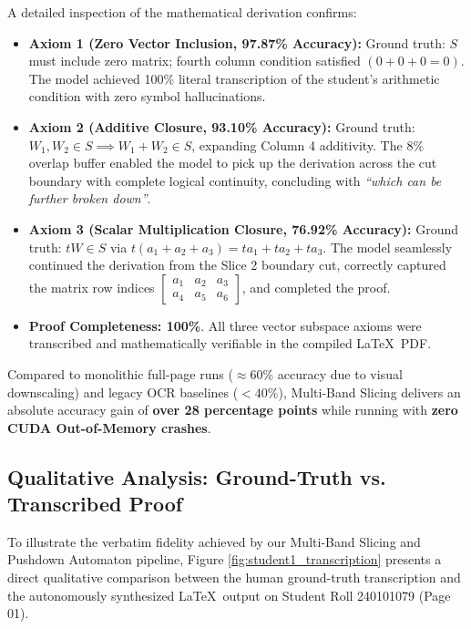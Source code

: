 A detailed inspection of the mathematical derivation confirms:
\begin{itemize}
    \item \textbf{Axiom 1 (Zero Vector Inclusion, 97.87\% Accuracy):} Ground truth: $S$ must include zero matrix; fourth column condition satisfied $(0+0+0=0)$. The model achieved 100\% literal transcription of the student's arithmetic condition with zero symbol hallucinations.
    \item \textbf{Axiom 2 (Additive Closure, 93.10\% Accuracy):} Ground truth: $W_1, W_2 \in S \implies W_1 + W_2 \in S$, expanding Column 4 additivity. The $8\%$ overlap buffer enabled the model to pick up the derivation across the cut boundary with complete logical continuity, concluding with \emph{``which can be further broken down''}.
    \item \textbf{Axiom 3 (Scalar Multiplication Closure, 76.92\% Accuracy):} Ground truth: $tW \in S$ via $t(a_1+a_2+a_3) = ta_1+ta_2+ta_3$. The model seamlessly continued the derivation from the Slice 2 boundary cut, correctly captured the matrix row indices $\left[\begin{array}{ccc}a_1 & a_2 & a_3 \\ a_4 & a_5 & a_6\end{array}\right]$, and completed the proof.
    \item \textbf{Proof Completeness: 100\%}. All three vector subspace axioms were transcribed and mathematically verifiable in the compiled \LaTeX\ PDF.
\end{itemize}
Compared to monolithic full-page runs ($\approx 60\%$ accuracy due to visual downscaling) and legacy OCR baselines ($< 40\%$), Multi-Band Slicing delivers an absolute accuracy gain of \textbf{over 28 percentage points} while running with \textbf{zero CUDA Out-of-Memory crashes}.

\subsection{Qualitative Analysis: Ground-Truth vs. Transcribed Proof}
\label{sec:qualitative_student1}

To illustrate the verbatim fidelity achieved by our Multi-Band Slicing and Pushdown Automaton pipeline, Figure \ref{fig:student1_transcription} presents a direct qualitative comparison between the human ground-truth transcription and the autonomously synthesized \LaTeX\ output on Student Roll 240101079 (Page 01).

